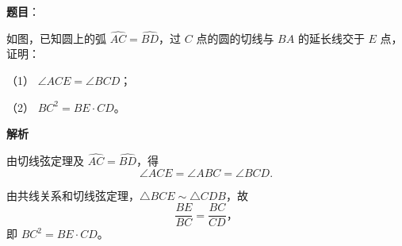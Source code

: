 \begin{answer}

\textbf{题目}：

如图，已知圆上的弧 $\widehat{AC}=\widehat{BD}$，过 $C$ 点的圆的切线与 $BA$ 的延长线交于 $E$ 点，证明：
\nopagebreak[4]
\begin{center}\end{center}
\nopagebreak[4]
（1） $\angle ACE=\angle BCD$；

（2） $BC^2=BE\cdot CD$。

\textbf{解析}


由切线弦定理及 $\widehat{AC}=\widehat{BD}$，得
\nopagebreak[4]
\[\angle ACE=\angle ABC=\angle BCD.
\]


由共线关系和切线弦定理，$\triangle BCE\sim\triangle CDB$，故
\nopagebreak[4]
\[\frac{BE}{BC}=\frac{BC}{CD}\text{，}
\]
即 $BC^2=BE\cdot CD$。



\end{answer}

